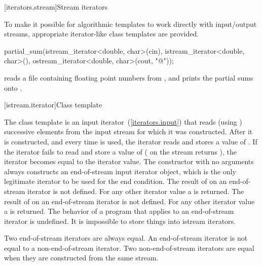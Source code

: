 [iterators.stream]{Stream iterators}

\pnum
To make it possible for algorithmic templates to work directly with input/output streams, appropriate
iterator-like
class templates
are provided.

\enterexample
\begin{codeblock}
partial_sum(istream_iterator<double, char>(cin),
  istream_iterator<double, char>(),
  ostream_iterator<double, char>(cout, "@\textbackslash@n"));
\end{codeblock}

reads a file containing floating point numbers from
,
and prints the partial sums onto
.
\exitexample

[istream.iterator]{Class template }

\pnum
{}%
The class template
is an input iterator~(\ref{iterators.input}) that
reads (using
)
successive elements from the input stream for which it was constructed.
After it is constructed, and every time
\tcode{++}
is used, the iterator reads and stores a value of
.
If the iterator fails to read and store a value of 
(
on the stream returns
),
the iterator becomes equal to the
iterator value.
The constructor with no arguments
always constructs
an end-of-stream input iterator object, which is the only legitimate iterator to be used
for the end condition.
The result of
on an end-of-stream iterator is not defined.
For any other iterator value a
is returned.
The result of
on an end-of-stream iterator is not defined.
For any other iterator value a
is returned.
The behavior of a program that applies  to an end-of-stream
iterator is undefined.
It is impossible to store things into istream iterators.

\pnum
Two end-of-stream iterators are always equal.
An end-of-stream iterator is not
equal to a non-end-of-stream iterator.
Two non-end-of-stream iterators are equal when they are constructed from the same stream.


